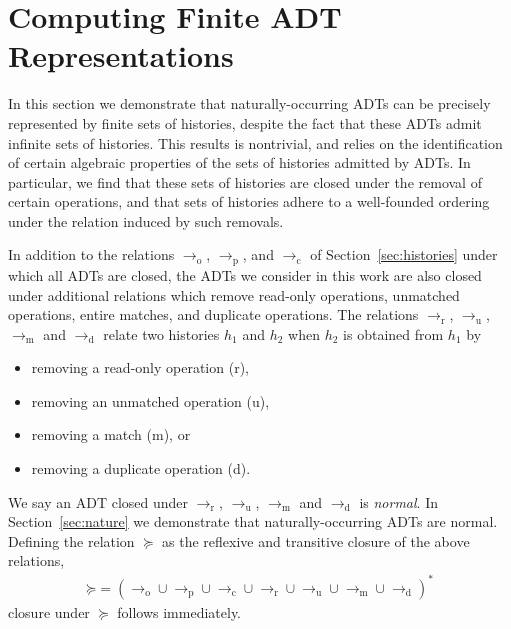 \section{Computing Finite ADT Representations}
\label{sec:patterns}

In this section we demonstrate that naturally-occurring ADTs can be precisely
represented by finite sets of histories, despite the fact that these ADTs admit
infinite sets of histories. This results is nontrivial, and relies on the
identification of certain algebraic properties of the sets of histories
admitted by ADTs. In particular, we find that these sets of histories are
closed under the removal of certain operations, and that sets of histories
adhere to a well-founded ordering under the relation induced by such removals.

In addition to the relations $\to_\mathrm{o}$, $\to_\mathrm{p}$, and
$\to_\mathrm{c}$ of Section~\ref{sec:histories} under which all ADTs are
closed, the ADTs we consider in this work are also closed under additional
relations which remove read-only operations, unmatched operations, entire
matches, and duplicate operations. The relations $\to_\mathrm{r}$,
$\to_\mathrm{u}$, $\to_\mathrm{m}$ and $\to_\mathrm{d}$ relate two histories
$h_1$ and $h_2$ when $h_2$ is obtained from $h_1$ by
\begin{itemize}

  \item removing a read-only operation (r),

  \item removing an unmatched operation (u),

  \item removing a match (m), or

  \item removing a duplicate operation (d).

\end{itemize}
We say an ADT closed under $\to_\mathrm{r}$, $\to_\mathrm{u}$, $\to_\mathrm{m}$
and $\to_\mathrm{d}$ is \emph{normal}. In Section~\ref{sec:nature} we
demonstrate that naturally-occurring ADTs are normal. Defining the relation
$\succeq$ as the reflexive and transitive closure of the above relations,
\begin{align*}
  \mathord{\succeq} = (
    \to_\mathrm{o} \cup \to_\mathrm{p} \cup \to_\mathrm{c} \cup 
    \to_\mathrm{r} \cup \to_\mathrm{u} \cup \to_\mathrm{m} \cup \to_\mathrm{d}
  )^\ast
\end{align*}
closure under $\succeq$ follows immediately.

